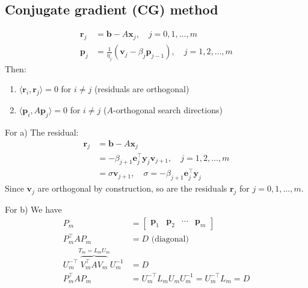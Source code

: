 \subsection{Conjugate gradient (CG) method}
\begin{proposition}{}{}
    \begin{align*}
        \mathbf{r}_j & = \mathbf{b} - A \mathbf{x}_j, \quad j = 0, 1, \dots, m                                \\
        \mathbf{p}_j & = \frac{1}{\eta_j} (\mathbf{v}_j - \beta_j \mathbf{p}_{j-1}), \quad j = 1, 2, \dots, m
    \end{align*}
    Then:
    \begin{enumerate}[label=(\alph*)]
        \item $\langle \mathbf{r}_i, \mathbf{r}_j \rangle = 0$ for $i \neq j$ (residuals are orthogonal)
        \item $\langle \mathbf{p}_i, A \mathbf{p}_j \rangle = 0$ for $i \neq j$ ($A$-orthogonal search directions)
    \end{enumerate}
\end{proposition}

For a) The residual:
\begin{align*}
    \mathbf{r}_j & = \mathbf{b} - A \mathbf{x}_j                                                            \\
                 & = -\beta_{j+1} \mathbf{e}_j^\top \mathbf{y}_j \mathbf{v}_{j+1}, \quad j = 1, 2, \dots, m \\
                 & = \sigma \mathbf{v}_{j+1}, \quad \sigma = -\beta_{j+1} \mathbf{e}_j^\top \mathbf{y}_j
\end{align*}
Since $\mathbf{v}_j$ are orthogonal by construction, so are the residuals $\mathbf{r}_j$ for $j = 0, 1, \dots, m$.

For b) We have
\begin{align*}
    P_m                                                          & = \begin{bmatrix}
                                                                         \mathbf{p}_1 & \mathbf{p}_2 & \cdots & \mathbf{p}_m
                                                                     \end{bmatrix} \\
    P_m^\top A P_m                                               & = D \text{ (diagonal) }                               \\
    U_m^{-\top}\overbrace{V_m^\top A V_m}^{T_m=L_m U_m} U_m^{-1} & = D                                                   \\
    P_m^\top A P_m                                               & = U_m^{-\top} L_m U_m U_m^{-1} = U_m^{-\top} L_m = D
\end{align*}

